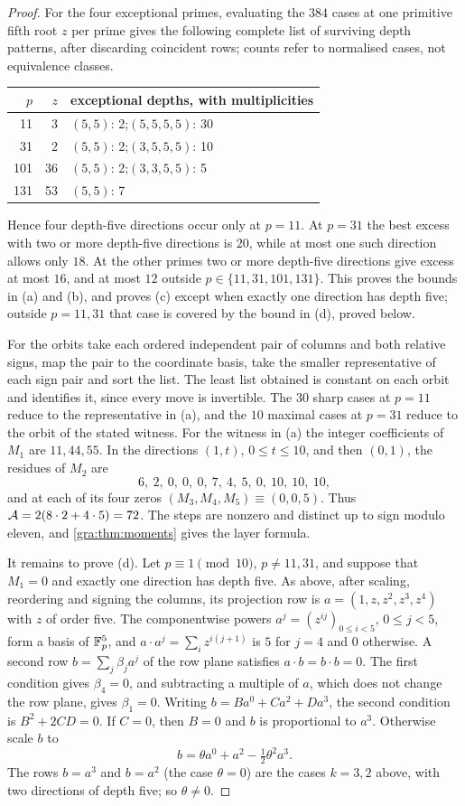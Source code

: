 \begin{proof}
For the four exceptional primes, evaluating the $384$ cases at one
primitive fifth root $z$ per prime gives the following complete list of
surviving depth patterns, after discarding coincident rows; counts refer to
normalised cases, not equivalence classes.
\begin{center}\small\upshape
\begin{tabular}{rrl}
\toprule
$p$ & $z$ & exceptional depths, with multiplicities\\
\midrule
11 & 3 & $(5,5)$: 2;\quad $(5,5,5,5)$: 30\\
31 & 2 & $(5,5)$: 2;\quad $(3,5,5,5)$: 10\\
101 & 36 & $(5,5)$: 2;\quad $(3,3,5,5)$: 5\\
131 & 53 & $(5,5)$: 7\\
\bottomrule
\end{tabular}
\end{center}
Hence four depth-five directions occur only at $p=11$. At $p=31$ the best
excess with two or more depth-five directions is $20$, while at most one
such direction allows only $18$. At the other primes two or more
depth-five directions give excess at most $16$, and at most $12$ outside
$p\in\{11,31,101,131\}$. This proves the bounds in (a) and (b), and proves
(c) except when exactly one direction has depth five; outside $p=11,31$
that case is covered by the bound in (d), proved below.

For the orbits take each ordered independent pair of columns and both
relative signs, map the pair to the coordinate basis, take the smaller
representative of each sign pair and sort the list. The least list
obtained is constant on each orbit and identifies it, since every move is
invertible. The $30$ sharp cases at $p=11$ reduce to the representative in
(a), and the $10$ maximal cases at $p=31$ reduce to the orbit of the
stated witness. For the witness in (a) the integer coefficients of $M_1$
are $11,44,55$. In the directions $(1,t)$, $0\le t\le10$, and then
$(0,1)$, the residues of $M_2$ are
\[
 6,\ 2,\ 0,\ 0,\ 0,\ 7,\ 4,\ 5,\ 0,\ 10,\ 10,\ 10,
\]
and at each of its four zeros $(M_3,M_4,M_5)\equiv(0,0,5)$. Thus
$\mathcal{A}=2(8\cdot2+4\cdot5)=72$. The steps are nonzero and distinct up to
sign modulo eleven, and \cref{gra:thm:moments} gives the layer formula.

It remains to prove (d). Let $p\equiv1\pmod{10}$, $p\ne11,31$, and suppose
that $M_1=0$ and exactly one direction has depth five. As above, after
scaling, reordering and signing the columns, its projection row is
$a=(1,z,z^2,z^3,z^4)$ with $z$ of order five. The componentwise powers
$a^j=(z^{ij})_{0\le i<5}$, $0\le j<5$, form a basis of $\mathbb{F}_p^5$, and
$a\cdot a^j=\sum_iz^{i(j+1)}$ is $5$ for $j=4$ and $0$ otherwise. A second
row $b=\sum_j\beta_ja^j$ of the row plane satisfies $a\cdot b=b\cdot b=0$.
The first condition gives $\beta_4=0$, and subtracting a multiple of $a$,
which does not change the row plane, gives $\beta_1=0$. Writing
$b=Ba^0+Ca^2+Da^3$, the second condition is $B^2+2CD=0$. If $C=0$, then
$B=0$ and $b$ is proportional to $a^3$. Otherwise scale $b$ to
\[
 b=\theta a^0+a^2-\tfrac12\theta^2a^3 .
\]
The rows $b=a^3$ and $b=a^2$ (the case $\theta=0$) are the cases $k=3,2$
above, with two directions of depth five; so $\theta\ne0$.


\end{proof}
